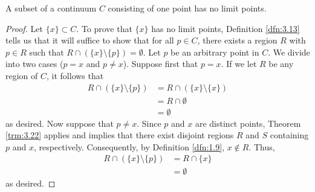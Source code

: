 \documentclass[../main.tex]{subfiles}
\begin{document}
\begin{corollary}\label{cly:3.23}
    A subset of a continuum $C$ consisting of one point has no limit points.
    \begin{proof}
        Let $\{x\}\subset C$. To prove that $\{x\}$ has no limit points, Definition \ref{dfn:3.13} tells us that it will suffice to show that for all $p\in C$, there exists a region $R$ with $p\in R$ such that $R\cap(\{x\}\setminus\{p\})=\emptyset$. Let $p$ be an arbitrary point in $C$. We divide into two cases ($p=x$ and $p\neq x$). Suppose first that $p=x$. If we let $R$ be any region of $C$, it follows that
        \begin{align*}
            R\cap(\{x\}\setminus\{p\}) &= R\cap(\{x\}\setminus\{x\})\\
            &= R\cap\emptyset\\
            &= \emptyset
        \end{align*}
        as desired. Now suppose that $p\neq x$. Since $p$ and $x$ are distinct points, Theorem \ref{trm:3.22} applies and implies that there exist disjoint regions $R$ and $S$ containing $p$ and $x$, respectively. Consequently, by Definition \ref{dfn:1.9}, $x\notin R$. Thus,
        \begin{align*}
            R\cap(\{x\}\setminus\{p\}) &= R\cap\{x\}\\
            &= \emptyset
        \end{align*}
        as desired.
    \end{proof}
\end{corollary}
\end{document}
